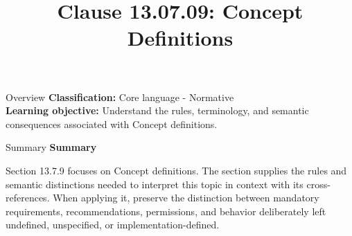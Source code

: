 \documentclass[10pt,letterpaper]{article}
\title{Clause 13.07.09: Concept Definitions}
\author{}
\date{}
\begin{document}
\maketitle
\begin{CornellOverviewBox}{Overview}
\textbf{Classification:} Core language - Normative\\[2pt]
\textbf{Learning objective:} Understand the rules, terminology, and semantic consequences associated with Concept definitions.
\end{CornellOverviewBox}\begin{CornellSummaryBox}{Summary}
{\sffamily\bfseries\color{Accent} Summary}\par\vspace{3pt}Section 13.7.9 focuses on Concept definitions. The section supplies the rules and semantic distinctions needed to interpret this topic in context with its cross-references. When applying it, preserve the distinction between mandatory requirements, recommendations, permissions, and behavior deliberately left undefined, unspecified, or implementation-defined.
\end{CornellSummaryBox}
\end{document}
